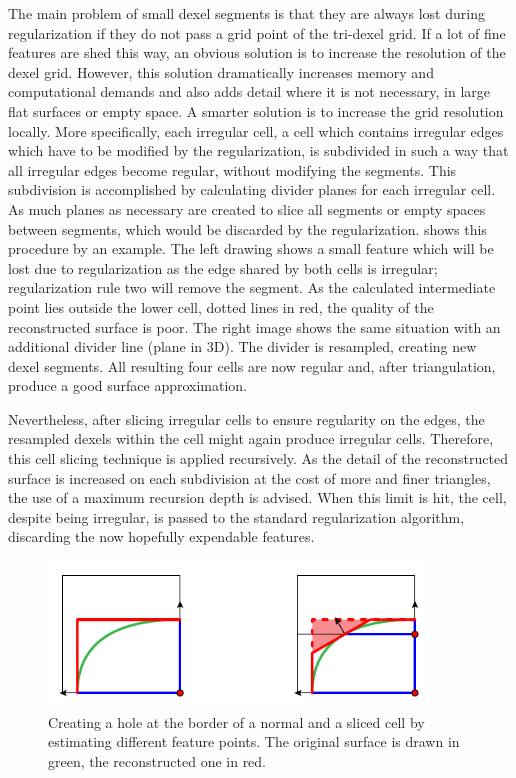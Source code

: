 The main problem of small dexel segments is that they are always lost during regularization if they do not pass a grid point of the tri-dexel grid.
If a lot of fine features are shed this way, an obvious solution is to increase the resolution of the dexel grid.
However, this solution dramatically increases memory and computational demands and also adds detail where it is not necessary, \eg in large flat surfaces or empty space.
A smarter solution is to increase the grid resolution locally.
More specifically, each irregular cell, \ie a cell which contains irregular edges which have to be modified by the regularization, is subdivided in such a way that all irregular edges become regular, without modifying the segments.
This subdivision is accomplished by calculating divider planes for each irregular cell.
As much planes as necessary are created to slice all segments or empty spaces between segments, which would be discarded by the regularization.
 shows this procedure by an example.
The left drawing shows a small feature which will be lost due to regularization as the edge shared by both cells is irregular; regularization rule two will remove the segment.
As the calculated intermediate point lies outside the lower cell, \cf dotted lines in red, the quality of the reconstructed surface is poor.
The right image shows the same situation with an additional divider line (plane in 3D).
The divider is resampled, creating new dexel segments.
All resulting four cells are now regular and, after triangulation, produce a good surface approximation.

Nevertheless, after slicing irregular cells to ensure regularity on the edges, the resampled dexels within the cell might again produce irregular cells.
Therefore, this cell slicing technique is applied recursively.
As the detail of the reconstructed surface is increased on each subdivision at the cost of more and finer triangles, the use of a maximum recursion depth is advised.
When this limit is hit, the cell, despite being irregular, is passed to the standard regularization algorithm, discarding the now hopefully expendable features.

\begin{figure}
	\centering
	\includegraphics[width=0.9\textwidth]{images/tri_dexel_hole_creation}
	\caption[Cell slicing creating a hole]{
		Creating a hole at the border of a normal and a sliced cell by estimating different feature points.
		The original surface is drawn in green, the reconstructed one in red.
	}
	\label{fig:tri_dexel_hole_creation}
\end{figure}

